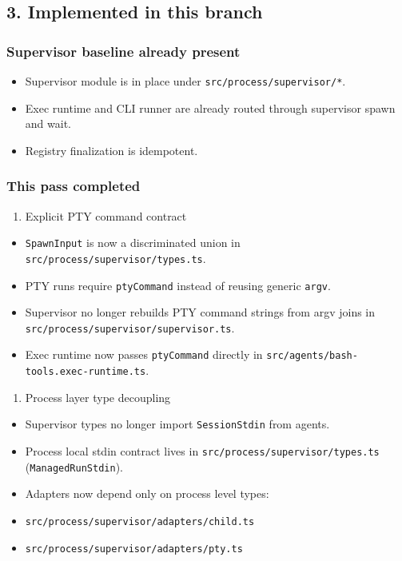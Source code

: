 \subsection{3. Implemented in this branch}


\subsubsection{Supervisor baseline already present}


\begin{itemize}
  \item Supervisor module is in place under \texttt{src/process/supervisor/*}.
  \item Exec runtime and CLI runner are already routed through supervisor spawn and wait.
  \item Registry finalization is idempotent.
\end{itemize}


\subsubsection{This pass completed}


\begin{enumerate}
  \item Explicit PTY command contract
\end{enumerate}


\begin{itemize}
  \item \texttt{SpawnInput} is now a discriminated union in \texttt{src/process/supervisor/types.ts}.
  \item PTY runs require \texttt{ptyCommand} instead of reusing generic \texttt{argv}.
  \item Supervisor no longer rebuilds PTY command strings from argv joins in \texttt{src/process/supervisor/supervisor.ts}.
  \item Exec runtime now passes \texttt{ptyCommand} directly in \texttt{src/agents/bash-tools.exec-runtime.ts}.
\end{itemize}


\begin{enumerate}
  \item Process layer type decoupling
\end{enumerate}


\begin{itemize}
  \item Supervisor types no longer import \texttt{SessionStdin} from agents.
  \item Process local stdin contract lives in \texttt{src/process/supervisor/types.ts} (\texttt{ManagedRunStdin}).
  \item Adapters now depend only on process level types:
  \item \texttt{src/process/supervisor/adapters/child.ts}
  \item \texttt{src/process/supervisor/adapters/pty.ts}
\end{itemize}


